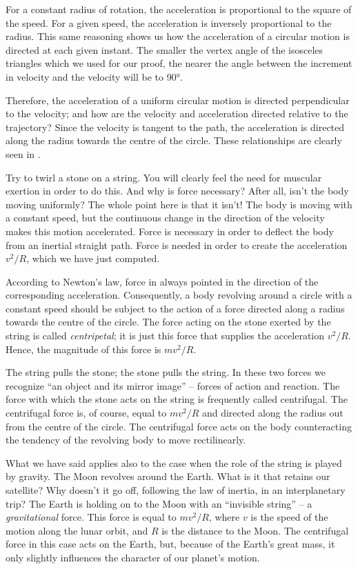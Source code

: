 For a constant radius of rotation, the acceleration is
proportional to the square of the speed. For a given speed,
the acceleration is inversely proportional to the radius.
This same reasoning shows us how the acceleration of
a circular motion is directed at each given instant. The
smaller the vertex angle of the isosceles triangles which
we used for our proof, the nearer the angle between the
increment in velocity and the velocity will be to \ang{90}.

Therefore, the acceleration of a uniform circular motion
is directed perpendicular to the velocity; and how are the
velocity and acceleration directed relative to the trajectory? Since the velocity is tangent to the path, the acceleration is directed along the radius towards the centre of the circle. These relationships are clearly seen in .

Try to twirl a stone on a string. You will clearly feel
the need for muscular exertion in order to do this. And
why is force necessary? After all, isn't the body moving
uniformly? The whole point here is that it isn't! The body
is moving with a constant speed, but the continuous change
in the direction of the velocity makes this motion accelerated. Force is necessary in order to deflect the body from an inertial straight path. Force is needed in order to create the acceleration $v^{2}/R$, which we have just computed.

According to Newton's law, force in always pointed
in the direction of the corresponding acceleration. Consequently, a body revolving around a circle with a constant speed should be subject to the action of a force directed along a radius towards the centre of the circle. The force acting on the stone exerted by the string is
called \emph{centripetal}; it is just this force that supplies the
acceleration $v^{2}/R$. Hence, the magnitude of this force
is $m v^{2}/R$.\label{cp}

The string pulls the stone; the stone pulls the string.
In these two forces we recognize ``an object and its mirror
image'' -- forces of action and reaction. The force with
which the stone acts on the string is frequently called
centrifugal. The centrifugal force is, of course, equal to
$m v^{2}/R$ and directed along the radius out from the centre
of the circle. The centrifugal force acts on the body counteracting the tendency of the revolving body to move rectilinearly.

What we have said applies also to the case when the
role of the string is played by gravity. The Moon revolves
around the Earth. What is it that retains our satellite?
Why doesn't it go off, following the law of inertia, in
an interplanetary trip? The Earth is holding on to the
Moon with an ``invisible string'' -- a \emph{gravitational} force.
This force is equal to $m v^{2}/R$, where $v$ is the speed of the
motion along the lunar orbit, and $R$ is the distance to the
Moon. The centrifugal force in this case acts on the Earth,
but, because of the Earth's great mass, it only slightly
influences the character of our planet's motion.

